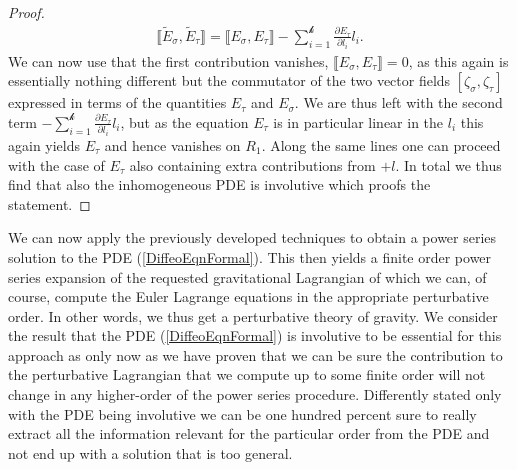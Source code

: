 \begin{proof}
\begin{align}
    \llbracket \tilde{E}_{\sigma}, \tilde{E}_{\tau} \rrbracket = \llbracket E_{\sigma}, E_{\tau} \rrbracket - \sum_{i=1}^{\mathcal{k}} \frac{\partial E_{\tau}}{\partial l_i} l_i.
\end{align}
We can now use that the first contribution vanishes, $\llbracket E_{\sigma}, E_{\tau} \rrbracket = 0$, as this again is essentially nothing different but the commutator of the two vector fields $[\zeta_{\sigma},\zeta_{\tau}]$ expressed in terms of the quantities $E_{\tau}$ and $E_{\sigma}$. We are thus left with the second term $- \sum_{i=1}^{\mathcal{k}} \frac{\partial E_{\tau}}{\partial l_i} l_i$, but as the equation $E_{\tau}$ is in particular linear in the $l_i$ this again yields $E_{\tau}$ and hence vanishes on $R_1$. Along the same lines one can proceed with the case of $E_{\tau}$ also containing extra contributions from $+l$. In total we thus find that also the inhomogeneous PDE is involutive which proofs the statement.
\end{proof}

We can now apply the previously developed techniques to obtain a power series solution to the PDE (\ref{DiffeoEqnFormal}). This then yields a finite order power series expansion of the requested gravitational Lagrangian of which we can, of course, compute the Euler Lagrange equations in the appropriate perturbative order. In other words, we thus get a perturbative theory of gravity. We consider the result that the PDE (\ref{DiffeoEqnFormal}) is involutive to be essential for this approach as only now as we have proven that we can be sure the contribution to the perturbative Lagrangian that we compute up to some finite order will not change in any higher-order of the power series procedure. Differently stated only with the PDE being involutive we can be one hundred percent sure to really extract all the information relevant for the particular order from the PDE and not end up with a solution that is too general. 

